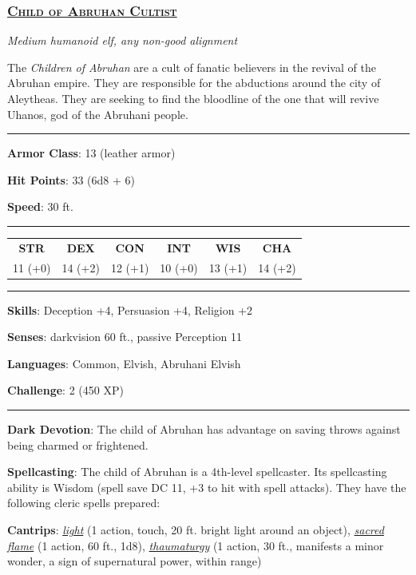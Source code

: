 \subsubsection*{\underline{\textsc{\Large Child of Abruhan Cultist}}}
\noindent\emph{Medium humanoid elf, any non-good alignment} 

The \emph{Children of Abruhan} are a cult of fanatic believers in the revival of the Abruhan empire. They are responsible for the abductions around the city of Aleytheas. They are seeking to find the bloodline of the one that will revive Uhanos, god of the Abruhani people. 

\noindent\rule{0.5\textwidth}{0.5pt}

\noindent\textbf{Armor Class}: 13 (leather armor)

\noindent\textbf{Hit Points}: 33 (6d8 + 6)

\noindent\textbf{Speed}: 30 ft.

\noindent\rule{0.5\textwidth}{0.5pt}
\begin{table}[H]
	\begin{tabular}{cccccc}
		\textbf{STR} & \textbf{DEX} & \textbf{CON} & \textbf{INT} & \textbf{WIS} & \textbf{CHA} \\
		11 (+0) & 14 (+2) & 12 (+1) & 10 (+0) & 13 (+1) & 14 (+2) \\
	\end{tabular}
\end{table}
\noindent\rule{0.5\textwidth}{0.5pt}

\noindent\textbf{Skills}: Deception +4, Persuasion +4, Religion +2

\noindent\textbf{Senses}: darkvision 60 ft., passive Perception 11

\noindent\textbf{Languages}: Common, Elvish, Abruhani Elvish

\noindent\textbf{Challenge}: 2 (450 XP)

\noindent\rule{0.5\textwidth}{0.5pt}

\noindent\textbf{Dark Devotion}: The child of Abruhan has advantage on saving throws against being charmed or frightened.

\noindent\textbf{Spellcasting}: The child of Abruhan is a 4th-level spellcaster. Its spellcasting ability is Wisdom (spell save DC 11, +3 to hit with spell attacks). They have the following cleric spells prepared:

\textbf{Cantrips}: \emph{\underline{light}} (1 action, touch, 20 ft. bright light around an object), \emph{\underline{sacred flame}} (1 action, 60 ft., 1d8), \emph{\underline{thaumaturgy}} (1 action, 30 ft., manifests a minor wonder, a sign of supernatural power, within range)

